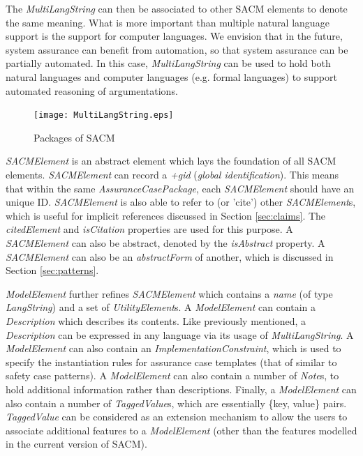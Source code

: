 The \textit{MultiLangString} can then be associated to other SACM elements to denote the same meaning. What is more important than multiple natural language support is the support for computer languages. We envision that in the future, system assurance can benefit from automation, so that system assurance can be partially automated. In this case, \textit{MultiLangString} can be used to hold both natural languages and computer languages (e.g. formal languages) to support automated reasoning of argumentations. 

\begin{figure}
	\centering
	\texttt{[image: MultiLangString.eps]}
	\caption{Packages of SACM}
	\label{fig:mulitiLang}
\end{figure}

\textit{SACMElement} is an abstract element which lays the foundation of all SACM elements. \textit{SACMElement} can record a \textit{+gid} (\textit{global identification}). 
This means that within the same \textit{AssuranceCasePackage}, each \textit{SACMElement} should have an unique ID. 
\textit{SACMElement} is also able to refer to (or 'cite') other \textit{SACMElement}s, which is useful for implicit references discussed in Section \ref{sec:claims}. The \textit{citedElement} and \textit{isCitation} properties are used for this purpose. A \textit{SACMElement} can also be abstract, denoted by the \textit{isAbstract} property. A \textit{SACMElement} can also be an \textit{abstractForm} of another, which is discussed in Section \ref{sec:patterns}. 

\textit{ModelElement} further refines \textit{SACMElement} which contains a \textit{name} (of type \textit{LangString}) and a set of \textit{UtilityElement}s. A \textit{ModelElement} can contain a \textit{Description} which describes its contents. Like previously mentioned, a \textit{Description} can be expressed in any language via its usage of \textit{MultiLangString}. A \textit{ModelElement} can also contain an \textit{ImplementationConstraint}, which is used to specify the instantiation rules for assurance case templates (that of similar to safety case patterns).
A \textit{ModelElement} can also contain a number of \textit{Note}s, to hold additional information rather than descriptions. Finally, a \textit{ModelElement} can also contain a number of \textit{TaggedValue}s, which are essentially \{key, value\} pairs. \textit{TaggedValue} can be considered as an extension mechanism to allow the users to associate additional features to a \textit{ModelElement} (other than the features modelled in the current version of SACM).

